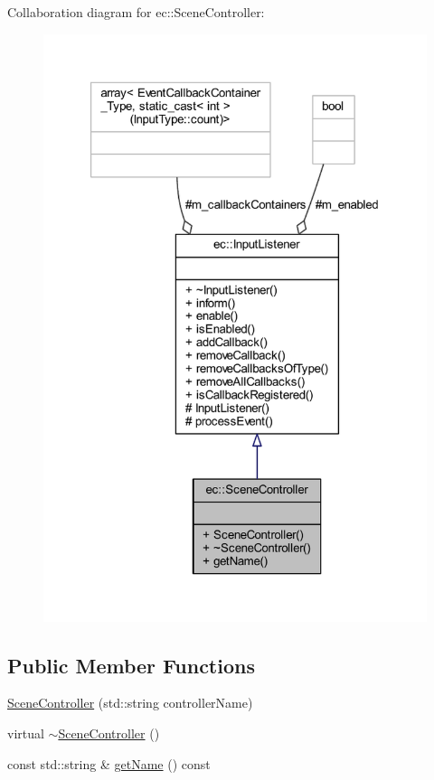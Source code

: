Collaboration diagram for ec\+:\+:Scene\+Controller\+:\nopagebreak
\begin{figure}[H]
\begin{center}
\leavevmode
\includegraphics[width=321pt]{classec_1_1_scene_controller__coll__graph}
\end{center}
\end{figure}
\subsection*{Public Member Functions}
\begin{DoxyCompactItemize}
\item 
\mbox{\hyperlink{classec_1_1_scene_controller_a97313b71165471f26f6e1bdec16392fd}{Scene\+Controller}} (std\+::string controller\+Name)
\item 
virtual \mbox{\hyperlink{classec_1_1_scene_controller_a48a2231bf316949cc1a8bc304ad5281c}{$\sim$\+Scene\+Controller}} ()
\item 
const std\+::string \& \mbox{\hyperlink{classec_1_1_scene_controller_af45d2fce41110dc9a128b900bde8ba14}{get\+Name}} () const
\end{DoxyCompactItemize}
